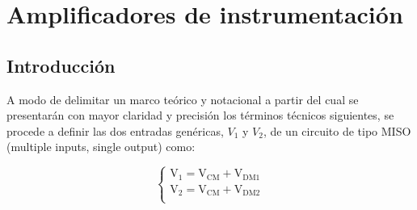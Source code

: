 \documentclass[../../tc_tp3_main.tex]{subfiles}
\begin{document}
\chapter{Amplificadores de instrumentación}

\section{Introducción}

	A modo de delimitar un marco teórico y notacional a partir del cual se presentarán con mayor claridad y precisión los términos técnicos siguientes, se procede a definir las dos entradas genéricas, $V_1$ y $V_2$, de un circuito de tipo MISO (multiple inputs, single output) como: \par
	
 	\begin{equation}
  	   \left\{
	  	    \begin{array}{ll}
		 					\mathrm{V_1} = \mathrm{V_{CM} + V_{DM1}} \\
			 				\mathrm{V_2} = \mathrm{V_{CM} + V_{DM2}} \\
	     	 \end{array}
	     	\right.
 	\end{equation}
 	
\end{document}
